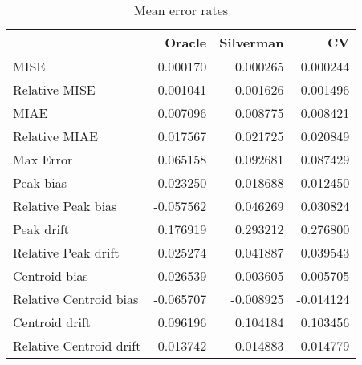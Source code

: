 \begin{table}[ht]
\centering
\begin{tabular}{lrrr}
  \hline
 & Oracle & Silverman & CV \\ 
  \hline
MISE & 0.000170 & 0.000265 & 0.000244 \\ 
  Relative MISE & 0.001041 & 0.001626 & 0.001496 \\ 
  MIAE & 0.007096 & 0.008775 & 0.008421 \\ 
  Relative MIAE & 0.017567 & 0.021725 & 0.020849 \\ 
  Max Error & 0.065158 & 0.092681 & 0.087429 \\ 
  Peak bias & -0.023250 & 0.018688 & 0.012450 \\ 
  Relative Peak bias & -0.057562 & 0.046269 & 0.030824 \\ 
  Peak drift & 0.176919 & 0.293212 & 0.276800 \\ 
  Relative Peak drift & 0.025274 & 0.041887 & 0.039543 \\ 
  Centroid bias & -0.026539 & -0.003605 & -0.005705 \\ 
  Relative Centroid bias & -0.065707 & -0.008925 & -0.014124 \\ 
  Centroid drift & 0.096196 & 0.104184 & 0.103456 \\ 
  Relative Centroid drift & 0.013742 & 0.014883 & 0.014779 \\ 
   \hline
\end{tabular}
\caption{Mean error rates} 
\label{tbl:mean_error_rates}
\end{table}
